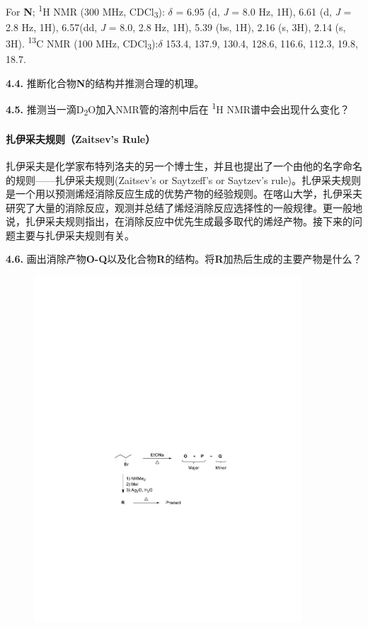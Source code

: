 For \textbf{N}; \textsuperscript{1}H NMR (300 MHz, CDCl\textsubscript{3}): $\delta$ = 6.95 (d,
\emph{J} = 8.0 Hz, 1H), 6.61 (d, \emph{J} = 2.8 Hz, 1H), 6.57(dd, \emph{J} = 8.0, 2.8 Hz, 1H), 5.39 (bs, 1H), 2.16 (s, 3H), 2.14 (s,
3H). \textsuperscript{13}C NMR (100 MHz, CDCl\textsubscript{3}):$\delta$ 153.4, 137.9, 130.4, 128.6, 116.6, 112.3, 19.8, 18.7.

\noindent\textbf{4.4.} 推断化合物\textbf{N}的结构并推测合理的机理。

\noindent\textbf{4.5.} 推测当一滴D\textsubscript{2}O加入NMR管的溶剂中后在
\textsuperscript{1}H NMR谱中会出现什么变化？

\paragraph{扎伊采夫规则（Zaitsev's Rule）}

扎伊采夫是化学家布特列洛夫的另一个博士生，并且也提出了一个由他的名字命名的规则------扎伊采夫规则(Zaitsev's or Saytzeff's or Saytzev's rule)。扎伊采夫规则是一个用以预测烯烃消除反应生成的优势产物的经验规则。在喀山大学，扎伊采夫研究了大量的消除反应，观测并总结了烯烃消除反应选择性的一般规律。更一般地说，扎伊采夫规则指出，在消除反应中优先生成最多取代的烯烃产物。接下来的问题主要与扎伊采夫规则有关。

\noindent\textbf{4.6.}
画出消除产物\textbf{O-Q}以及化合物\textbf{R}的结构。将\textbf{R}加热后生成的主要产物是什么？

\begin{figure}[h]
	\centering
	\includegraphics[width=10cm]{./pic/t4-6.pdf}
\end{figure}

